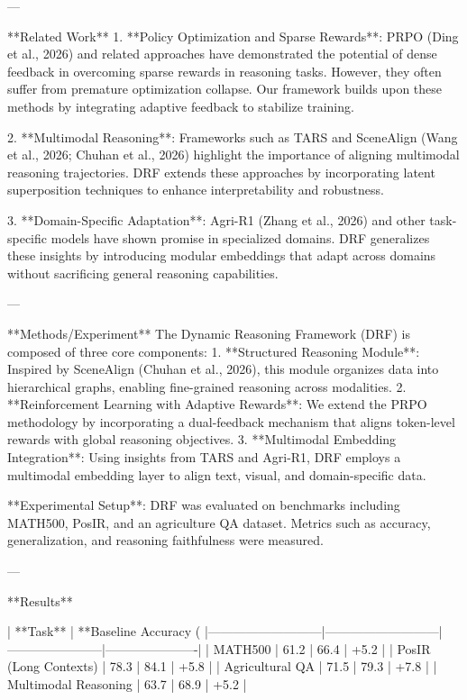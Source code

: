 ---

**Related Work**  
1. **Policy Optimization and Sparse Rewards**: PRPO (Ding et al., 2026) and related approaches have demonstrated the potential of dense feedback in overcoming sparse rewards in reasoning tasks. However, they often suffer from premature optimization collapse. Our framework builds upon these methods by integrating adaptive feedback to stabilize training.

2. **Multimodal Reasoning**: Frameworks such as TARS and SceneAlign (Wang et al., 2026; Chuhan et al., 2026) highlight the importance of aligning multimodal reasoning trajectories. DRF extends these approaches by incorporating latent superposition techniques to enhance interpretability and robustness.

3. **Domain-Specific Adaptation**: Agri-R1 (Zhang et al., 2026) and other task-specific models have shown promise in specialized domains. DRF generalizes these insights by introducing modular embeddings that adapt across domains without sacrificing general reasoning capabilities.

---

**Methods/Experiment**  
The Dynamic Reasoning Framework (DRF) is composed of three core components:  
1. **Structured Reasoning Module**: Inspired by SceneAlign (Chuhan et al., 2026), this module organizes data into hierarchical graphs, enabling fine-grained reasoning across modalities.  
2. **Reinforcement Learning with Adaptive Rewards**: We extend the PRPO methodology by incorporating a dual-feedback mechanism that aligns token-level rewards with global reasoning objectives.  
3. **Multimodal Embedding Integration**: Using insights from TARS and Agri-R1, DRF employs a multimodal embedding layer to align text, visual, and domain-specific data.  

**Experimental Setup**: DRF was evaluated on benchmarks including MATH500, PosIR, and an agriculture QA dataset. Metrics such as accuracy, generalization, and reasoning faithfulness were measured.

---

**Results**  

| **Task**                  | **Baseline Accuracy (%
|---------------------------|---------------------------|-----------------------|----------------------|
| MATH500                  | 61.2                      | 66.4                  | +5.2                |
| PosIR (Long Contexts)    | 78.3                      | 84.1                  | +5.8                |
| Agricultural QA          | 71.5                      | 79.3                  | +7.8                |
| Multimodal Reasoning     | 63.7                      | 68.9                  | +5.2                |

